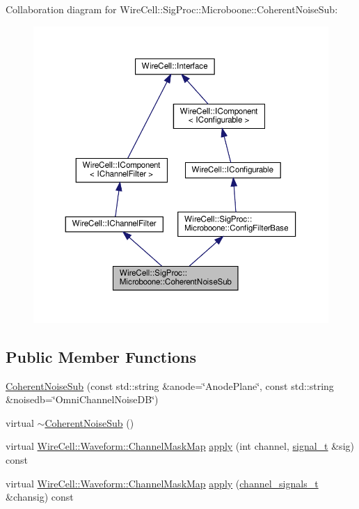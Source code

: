 Collaboration diagram for Wire\+Cell\+:\+:Sig\+Proc\+:\+:Microboone\+:\+:Coherent\+Noise\+Sub\+:
\nopagebreak
\begin{figure}[H]
\begin{center}
\leavevmode
\includegraphics[width=350pt]{class_wire_cell_1_1_sig_proc_1_1_microboone_1_1_coherent_noise_sub__coll__graph}
\end{center}
\end{figure}
\subsection*{Public Member Functions}
\begin{DoxyCompactItemize}
\item 
\hyperlink{class_wire_cell_1_1_sig_proc_1_1_microboone_1_1_coherent_noise_sub_a3f5ef54c3ed9fb3f8dbd9141aa08bb73}{Coherent\+Noise\+Sub} (const std\+::string \&anode=\char`\"{}Anode\+Plane\char`\"{}, const std\+::string \&noisedb=\char`\"{}Omni\+Channel\+Noise\+DB\char`\"{})
\item 
virtual \hyperlink{class_wire_cell_1_1_sig_proc_1_1_microboone_1_1_coherent_noise_sub_a51b125b33f083f79e1971bb2472fab5e}{$\sim$\+Coherent\+Noise\+Sub} ()
\item 
virtual \hyperlink{namespace_wire_cell_1_1_waveform_a18b9ae61c858e340252ba3ac83ac3bc0}{Wire\+Cell\+::\+Waveform\+::\+Channel\+Mask\+Map} \hyperlink{class_wire_cell_1_1_sig_proc_1_1_microboone_1_1_coherent_noise_sub_a039888ecfad21c7a4e5724566661501d}{apply} (int channel, \hyperlink{class_wire_cell_1_1_i_channel_filter_a434ed96cc4b805fa0eeec14f9f8d85e9}{signal\+\_\+t} \&sig) const
\item 
virtual \hyperlink{namespace_wire_cell_1_1_waveform_a18b9ae61c858e340252ba3ac83ac3bc0}{Wire\+Cell\+::\+Waveform\+::\+Channel\+Mask\+Map} \hyperlink{class_wire_cell_1_1_sig_proc_1_1_microboone_1_1_coherent_noise_sub_a0c98bcbea0288592dfe6603e92b742b5}{apply} (\hyperlink{class_wire_cell_1_1_i_channel_filter_a44de35ce47701d84cd45393c6bcd5e2f}{channel\+\_\+signals\+\_\+t} \&chansig) const
\end{DoxyCompactItemize}
